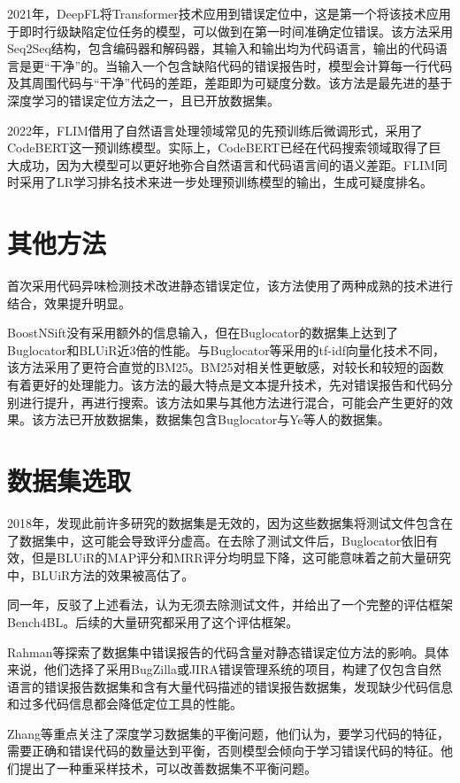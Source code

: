 2021年，DeepFL\cite{9653844}将Transformer技术应用到错误定位中，这是第一个将该技术应用于即时行级缺陷定位任务的模型，可以做到在第一时间准确定位错误。该方法采用Seq2Seq结构，包含编码器和解码器，其输入和输出均为代码语言，输出的代码语言是更“干净”\cite{6227135}的。当输入一个包含缺陷代码的错误报告时，模型会计算每一行代码及其周围代码与“干净”代码的差距，差距即为可疑度分数。该方法是最先进的基于深度学习的错误定位方法之一，且已开放数据集。

2022年，FLIM\cite{Liang2022}借用了自然语言处理领域常见的先预训练后微调形式，采用了CodeBERT\cite{2020CodeBERT}这一预训练模型。实际上，CodeBERT已经在代码搜索领域取得了巨大成功，因为大模型可以更好地弥合自然语言和代码语言间的语义差距。FLIM同时采用了LR学习排名技术来进一步处理预训练模型的输出，生成可疑度排名。
\section{其他方法}
\cite{8973028}首次采用代码异味检测技术改进静态错误定位，该方法使用了两种成熟的技术进行结合，效果提升明显。

BoostNSift\cite{9610655}没有采用额外的信息输入，但在Buglocator的数据集上达到了Buglocator和BLUiR近3倍的性能。与Buglocator等采用的tf-idf向量化技术不同，该方法采用了更符合直觉的BM25。BM25对相关性更敏感，对较长和较短的函数有着更好的处理能力。该方法的最大特点是文本提升技术，先对错误报告和代码分别进行提升，再进行搜索。该方法如果与其他方法进行混合，可能会产生更好的效果。该方法已开放数据集，数据集包含Buglocator与Ye等人的数据集。
\section{数据集选取}
2018年，\cite{8449523}发现此前许多研究的数据集是无效的，因为这些数据集将测试文件包含在了数据集中，这可能会导致评分虚高。在去除了测试文件后，Buglocator依旧有效，但是BLUiR的MAP评分和MRR评分均明显下降，这可能意味着之前大量研究中，BLUiR方法的效果被高估了。

同一年，\cite{10.1145/3213846.3213856}反驳了上述看法，认为无须去除测试文件，并给出了一个完整的评估框架Bench4BL。后续的大量研究都采用了这个评估框架。

Rahman等\cite{10.1145/3183440.3195003}探索了数据集中错误报告的代码含量对静态错误定位方法的影响。具体来说，他们选择了采用BugZilla或JIRA错误管理系统的项目，构建了仅包含自然语言的错误报告数据集和含有大量代码描述的错误报告数据集，发现缺少代码信息和过多代码信息都会降低定位工具的性能。

Zhang等\cite{https://doi.org/10.1002/smr.2312}重点关注了深度学习数据集的平衡问题，他们认为，要学习代码的特征，需要正确和错误代码的数量达到平衡，否则模型会倾向于学习错误代码的特征。他们提出了一种重采样技术，可以改善数据集不平衡问题。